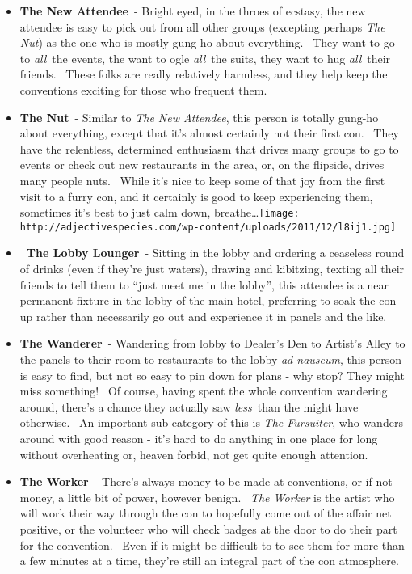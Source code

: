 \begin{itemize}
\tightlist
\item
  \textbf{The New Attendee}~- Bright eyed, in the throes of ecstasy, the
  new attendee is easy to pick out from all other groups (excepting
  perhaps \emph{The Nut}) as the one who is mostly gung-ho about
  everything. ~They want to go to \emph{all}~the events, the want to
  ogle \emph{all}~the suits, they want to hug \emph{all}~their friends.
  ~These folks are really relatively harmless, and they help keep the
  conventions exciting for those who frequent them.
\item
  \textbf{The Nut}~- Similar to \emph{The New Attendee}, this person is
  totally gung-ho about everything, except that it's almost certainly
  not their first con. ~They have the relentless, determined enthusiasm
  that drives many groups to go to events or check out new restaurants
  in the area, or, on the flipside, drives many people nuts. ~While it's
  nice to keep some of that joy from the first visit to a furry con, and
  it certainly is good to keep experiencing them, sometimes it's best to
  just calm down,
  breathe\ldots{}\texttt{[image: http://adjectivespecies.com/wp-content/uploads/2011/12/l8ij1.jpg]}
\item
  \textbf{~The Lobby Lounger}~- Sitting in the lobby and ordering a
  ceaseless round of drinks (even if they're just waters), drawing and
  kibitzing, texting all their friends to tell them to ``just meet me in
  the lobby'', this attendee is a near permanent fixture in the lobby of
  the main hotel, preferring to soak the con up rather than necessarily
  go out and experience it in panels and the like.
\item
  \textbf{The Wanderer}~- Wandering from lobby to Dealer's Den to
  Artist's Alley to the panels to their room to restaurants to the lobby
  \emph{ad nauseum}, this person is easy to find, but not so easy to pin
  down for plans - why stop? They might miss something! ~Of course,
  having spent the whole convention wandering around, there's a chance
  they actually saw \emph{less}~than the might have otherwise. ~An
  important sub-category of this is \emph{The Fursuiter}, who wanders
  around with good reason - it's hard to do anything in one place for
  long without overheating or, heaven forbid, not get quite enough
  attention.
\item
  \textbf{The Worker}~- There's always money to be made at conventions,
  or if not money, a little bit of power, however benign. ~\emph{The
  Worker }is the artist who will work their way through the con to
  hopefully come out of the affair net positive, or the volunteer who
  will check badges at the door to do their part for the convention.
  ~Even if it might be difficult to to see them for more than a few
  minutes at a time, they're still an integral part of the con
  atmosphere.
\end{itemize}

